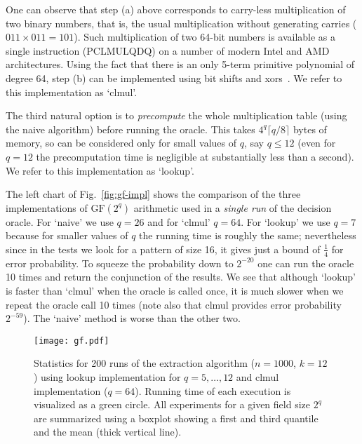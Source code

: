 \documentclass[11pt]{article}
\newcommand{\field}[1]{{\textrm{GF}}({#1})}
\begin{document}
One can observe that step (a) above corresponds to carry-less multiplication of two binary numbers, that is, the usual multiplication without generating carries ($011\times 011=101$). Such multiplication of two 64-bit numbers is available as a single instruction (PCLMULQDQ) on a number of modern Intel and AMD architectures. Using the fact that there is an only 5-term primitive polynomial of degree 64, step (b) can be implemented using bit shifts and xors~\cite{gueron2010efficient}. We refer to this implementation as `clmul'.

The third natural option is to {\em precompute} the whole multiplication table (using the naive algorithm) before running the oracle.
This takes $4^q\lceil q/8\rceil$ bytes of memory, so can be considered only for small values of $q$, say $q\le 12$ (even for $q=12$ the precomputation time is negligible at substantially less than a second). We refer to this implementation as `lookup'.

The left chart of Fig.~\ref{fig:gf-impl} shows the comparison of the three implementations of $\field{2^q}$ arithmetic used in a {\em single run} of the decision oracle. For `naive' we use $q=26$ and for `clmul' $q=64$. For `lookup' we use $q=7$ because for smaller values of $q$ the running time is roughly the same; nevertheless since in the tests we look for a pattern of size 16, it gives just a bound of $\frac{1}4$ for error probability. To squeeze the probability down to $2^{-20}$ one can run the oracle 10 times and return the conjunction of the results. We see that although `lookup' is faster than `clmul' when the oracle is called once, it is much slower when we repeat the oracle call 10 times (note also that clmul provides error probability $2^{-59}$). The `naive' method is worse than the other two. 

 \begin{figure}[!ht]
  \texttt{[image: gf.pdf]}
  \label{fig:boxplots}
  \caption{Statistics for 200 runs of the extraction algorithm ($n=1000$, $k=12$) using lookup implementation for $q=5,\ldots,12$ and clmul implementation ($q=64$). Running time of each execution is visualized as a green circle. All experiments for a given field size $2^q$ are summarized using a boxplot showing a first and third quantile and the mean (thick vertical line).}
 \end{figure}
\end{document}
